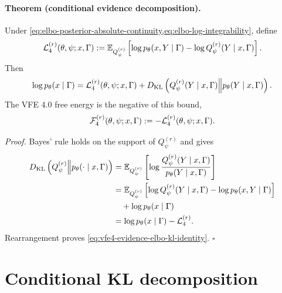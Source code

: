 \paragraph{Theorem (conditional evidence decomposition).}
Under \cref{eq:elbo-posterior-absolute-continuity,eq:elbo-log-integrability}, define
\begin{equation}
\mathcal L_4^{(r)}(\theta,\psi;x,\Gamma)
:=\mathbb E_{Q_\psi^{(r)}}\left[
\log p_\theta(x,Y\mid\Gamma)
-\log Q_\psi^{(r)}(Y\mid x,\Gamma)
\right].
\label{eq:vfe4-elbo-definition}
\end{equation}
Then
\begin{equation}
\log p_\theta(x\mid\Gamma)
=\mathcal L_4^{(r)}(\theta,\psi;x,\Gamma)
+D_{\mathrm{KL}}\left(
Q_\psi^{(r)}(Y\mid x,\Gamma)
\middle\Vert
p_\theta(Y\mid x,\Gamma)
\right).
\label{eq:vfe4-evidence-elbo-kl-identity}
\end{equation}
The VFE 4.0 free energy is the negative of this bound,
\begin{equation}
\mathcal F_4^{(r)}(\theta,\psi;x,\Gamma)
:=-\mathcal L_4^{(r)}(\theta,\psi;x,\Gamma).
\label{eq:vfe4-free-energy-definition}
\end{equation}

\emph{Proof.}
Bayes' rule holds on the support of $Q_\psi^{(r)}$ and gives
\begin{equation}
\begin{aligned}
D_{\mathrm{KL}}\left(Q_\psi^{(r)}\middle\Vert p_\theta(\mathord{\cdot}\mid x,\Gamma)\right)
&=\mathbb E_{Q_\psi^{(r)}}\left[
\log\frac{Q_\psi^{(r)}(Y\mid x,\Gamma)}
{p_\theta(Y\mid x,\Gamma)}
\right]\\
&=\mathbb E_{Q_\psi^{(r)}}\left[
\log Q_\psi^{(r)}(Y\mid x,\Gamma)
-\log p_\theta(x,Y\mid\Gamma)
\right]\\
&\quad+\log p_\theta(x\mid\Gamma)\\
&=\log p_\theta(x\mid\Gamma)-\mathcal L_4^{(r)}.
\end{aligned}
\label{eq:evidence-decomposition-proof}
\end{equation}
Rearrangement proves \cref{eq:vfe4-evidence-elbo-kl-identity}. \hfill$\square$

\section{Conditional KL decomposition}

